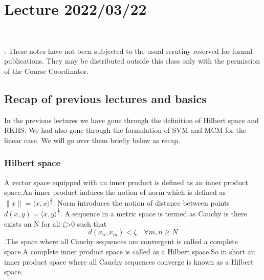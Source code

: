 \documentclass[../main.tex]{subfiles}
\newcommand{\counter}{0}
\begin{document}
\chapter{Lecture 2022/03/22} 

		\begin{center}
			\ \\
		\end{center}
		
		: {These notes have not been subjected to the
			usual scrutiny reserved for formal publications.  They may be distributed
			outside this class only with the permission of the Course Coordinator.}
		\vspace*{4mm}
		\setcounter{section}{\counter}

\tableofcontents


\newpage

\section{Recap of previous lectures and basics}
In the previous lectures we have gone through the definition of Hilbert space and RKHS. We had also gone through the formulation of SVM and MCM for the linear case. We will go over them briefly below as recap.
    \subsection{Hilbert space}
    A vector space equipped with an inner product is defined as an inner product space.An inner product induces the notion of norm which is defined as $\|x\|=\langle x, x\rangle^{\frac{1}{2}}$. Norm introduces the notion of distance between points $ d(x,y)=\langle x, y\rangle^{\frac{1}{2}}$.
    \newline
    A sequence in a metric space is termed as Cauchy is there exists an N for all $\zeta$>0 such that $$d\left(x_{n}, x_{m}\right)<\zeta \quad \forall m, n \geq N$$.The space where all Cauchy sequences are convergent is called a complete space.A complete inner product space is called as a Hilbert space.So in short an inner product space where all Cauchy sequences converge is known as a Hilbert space.
\end{document}
